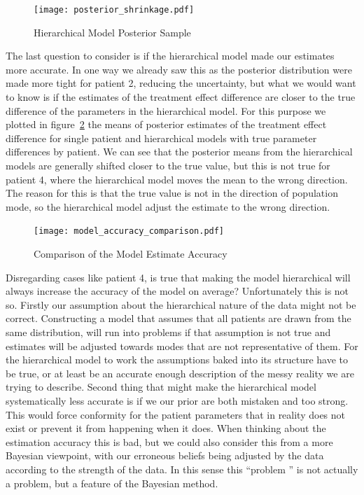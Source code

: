 \documentclass[12pt,a4paper,leqno]{report}
\theoremstyle{plain}
\theoremstyle{definition}
\theoremstyle{remark}
\begin{document}
\bigskip
\begin{figure}[H]
    \caption{Hierarchical Model Posterior Sample}\label{posteriorshrinkage}
    \bigskip
    \centering
    \texttt{[image: posterior\_shrinkage.pdf]}
\end{figure}
\bigskip

The last question to consider is if the hierarchical model made our estimates more
accurate. In one way we already saw this as the posterior distribution were made more
tight for patient 2, reducing the uncertainty, but what we would want to know is if the
estimates of the treatment effect difference are closer to the true difference of the
parameters in the hierarchical model. For this purpose we plotted in figure\
\ref{modelaccuracycomparison} the means of posterior
estimates of the treatment effect difference for single patient and hierarchical models
with true parameter differences by patient. We can see that the posterior means from the
hierarchical models are generally shifted closer to the true value, but this is not true
for patient 4, where the hierarchical model moves the mean to the wrong direction. The
reason for this is that the true value is not in the direction of population mode, so
the hierarchical model adjust the estimate to the wrong direction.

\bigskip
\begin{figure}[H]
    \caption{Comparison of the Model Estimate Accuracy}\label{modelaccuracycomparison}
    \bigskip
    \centering
    \texttt{[image: model\_accuracy\_comparison.pdf]}
\end{figure}
\bigskip

Disregarding cases like patient 4, is true that making the model hierarchical will always
increase the accuracy of the model on average? Unfortunately this is not so. Firstly our
assumption about the hierarchical nature of the data might not be correct. Constructing
a model that assumes that all patients are drawn from the same distribution, will run
into problems if that assumption is not true and estimates will be adjusted towards
modes that are not representative of them. For the hierarchical model to work the
assumptions baked into its structure have to be true, or at least be an accurate enough
description of the messy reality we are trying to describe. Second thing that might make
the hierarchical model systematically less accurate is if we our prior are both mistaken
and too strong. This would force conformity for the patient parameters that in reality
does not exist or prevent it from happening when it does. When thinking about the
estimation accuracy this is bad, but we could also consider this from a more Bayesian
viewpoint, with our erroneous beliefs being adjusted by the data according to the
strength of the data. In this sense this ``problem '' is not actually a problem, but a
feature of the Bayesian method.
\end{document}
